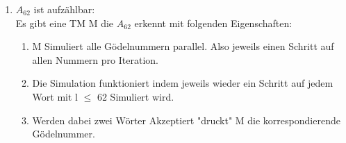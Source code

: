 \documentclass{article}
\begin{document}
\begin{enumerate} [label=(\alph*).]
\begin{enumerate}[label=\Roman*.]
\begin{enumerate}[label=]
					$\Rightarrow \langle M_{neu} \rangle \in A_{62}$\\
					$\Rightarrow f(w) \in A_{62}$
					\\\\	
					$w \notin H_{\epsilon} \Rightarrow$ M hält nicht auf $\epsilon$\\
					$\Rightarrow \langle M_{neu} \rangle$ hält auf keiner Eingabe\\
					$\Rightarrow \langle M_{neu} \rangle \notin A_{62}$\\
					$\Rightarrow f(w) \notin A_{62}$\\
					Daher ist $H_{\epsilon} \leq A_{62} \Rightarrow A_{62}$ ist nicht Rekursiv.  
				\end{enumerate}
			\item $A_{62}$ ist aufzählbar:\\
			Es gibt eine TM M die $A_{62}$ erkennt mit folgenden Eigenschaften:
			\begin{enumerate}[label=$\bullet$]
				\item M Simuliert alle Gödelnummern parallel. Also jeweils einen Schritt auf allen Nummern pro Iteration.
				\item Die Simulation funktioniert indem jeweils wieder ein Schritt auf jedem Wort mit l $\leq$ 62 Simuliert wird.
				\item Werden dabei zwei Wörter Akzeptiert "druckt" M die korrespondierende Gödelnummer.
			\end{enumerate}
			\end{enumerate}
		\end{enumerate}
\end{document}
